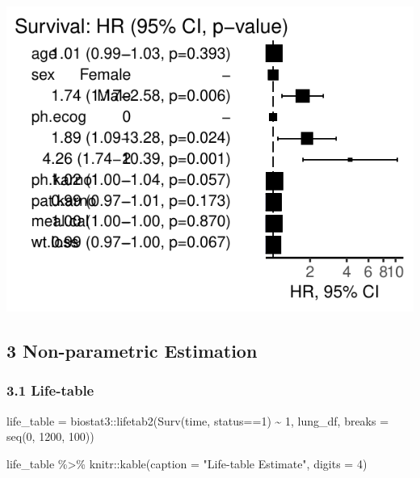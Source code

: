 \documentclass[
]{article}
\newenvironment{Shaded}{\begin{snugshade}}{\end{snugshade}}
\newcommand{\AttributeTok}[1]{\textcolor[rgb]{0.77,0.63,0.00}{#1}}
\newcommand{\DecValTok}[1]{\textcolor[rgb]{0.00,0.00,0.81}{#1}}
\newcommand{\FunctionTok}[1]{\textcolor[rgb]{0.00,0.00,0.00}{#1}}
\newcommand{\NormalTok}[1]{#1}
\newcommand{\OtherTok}[1]{\textcolor[rgb]{0.56,0.35,0.01}{#1}}
\newcommand{\SpecialCharTok}[1]{\textcolor[rgb]{0.00,0.00,0.00}{#1}}
\newcommand{\StringTok}[1]{\textcolor[rgb]{0.31,0.60,0.02}{#1}}
\begin{document}
\includegraphics{final_project_files/figure-latex/unnamed-chunk-8-1.pdf}

\hypertarget{non-parametric-estimation}{%
\subsection{3 Non-parametric
Estimation}\label{non-parametric-estimation}}

\hypertarget{life-table}{%
\subsubsection{3.1 Life-table}\label{life-table}}

\begin{Shaded}
\begin{Highlighting}[]
\NormalTok{life\_table }\OtherTok{=}\NormalTok{ biostat3}\SpecialCharTok{::}\FunctionTok{lifetab2}\NormalTok{(}\FunctionTok{Surv}\NormalTok{(time, status}\SpecialCharTok{==}\DecValTok{1}\NormalTok{) }\SpecialCharTok{\textasciitilde{}} \DecValTok{1}\NormalTok{, lung\_df, }\AttributeTok{breaks =} \FunctionTok{seq}\NormalTok{(}\DecValTok{0}\NormalTok{, }\DecValTok{1200}\NormalTok{, }\DecValTok{100}\NormalTok{))}

\NormalTok{life\_table }\SpecialCharTok{\%\textgreater{}\%}
\NormalTok{  knitr}\SpecialCharTok{::}\FunctionTok{kable}\NormalTok{(}\AttributeTok{caption =} \StringTok{"Life{-}table Estimate"}\NormalTok{,}
               \AttributeTok{digits =} \DecValTok{4}\NormalTok{)}
\end{Highlighting}
\end{Shaded}
\end{document}
